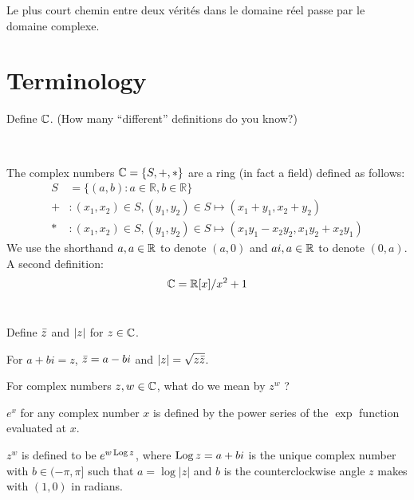 \documentclass{homework}
\author{Alex Li}
\begin{document}
\maketitle

\begin{inspiration}
Le plus court chemin entre deux v\'erit\'es dans le domaine r\'eel passe par le domaine complexe.
\end{inspiration}

\section{Terminology}

\begin{problem}
  Define $\mathbb{C}$.  (How many ``different'' definitions do you know?)
\end{problem}\\
\begin{solution}
The complex numbers $\mathbb{C} = \{S, +, *\}$ are a ring (in fact a field) defined as follows:
\begin{align*}
S &= \{(a, b): a\in \mathbb{R}, b\in \mathbb{R}\}\\
+ &: (x_1, x_2) \in S, (y_1, y_2) \in S \mapsto (x_1 + y_1, x_2 + y_2)\\
* &: (x_1, x_2) \in S, (y_1, y_2) \in S \mapsto (x_1y_1 - x_2y_2, x_1y_2 + x_2    y_1)
\end{align*}
We use the shorthand $a, a\in\mathbb{R}$ to denote $(a, 0)$ and $ai, a\in \mathbb{R}$ to denote $(0, a)$.
\\
A second definition:
$$\mathbb{C} = \mathbb{R}[x]/x^2 + 1$$
\\
\end{solution}
\begin{problem}
  Define $\bar{z}$ and $\left|z\right|$ for $z \in \mathbb{C}$.
\end{problem}
\begin{solution}
For $a+bi=z$, $\bar{z}=a-bi$ and $\left|z\right|=\sqrt{z\bar{z}}$.
\end{solution}

\begin{problem}
For complex numbers $z, w \in \mathbb{C}$, what do we mean by $z^w$ ?
\end{problem}
\begin{solution}
$e^x$ for any complex number $x$ is defined by the power series of the $\exp$ function evaluated at $x$.

$z^w$ is defined to be $e^{w \operatorname{Log} z}$, where $\operatorname{Log} z = a+bi$ is the unique complex number with $b\in(-\pi, \pi]$ such that $a = \log|z|$ and $b$ is the counterclockwise angle $z$ makes with $(1,0)$ in radians.
\end{solution}
\end{document}
